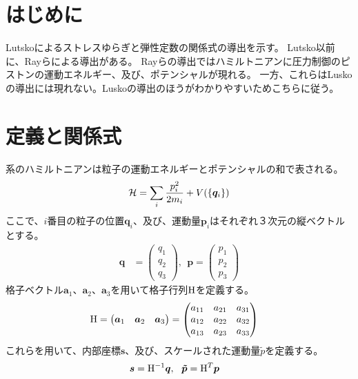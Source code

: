 \documentclass[11pt,a4paper,uplatex]{jsarticle}
\begin{document}
\section{はじめに}
Lutskoによるストレスゆらぎと弾性定数の関係式の導出を示す\cite{Lutsko1989}。
Lutsko以前に、Rayらによる導出がある。
Rayらの導出ではハミルトニアンに圧力制御のピストンの運動エネルギー、及び、ポテンシャルが現れる。
一方、これらはLuskoの導出には現れない。Luskoの導出のほうがわかりやすいためこちらに従う。
\section{定義と関係式}
系のハミルトニアンは粒子の運動エネルギーとポテンシャルの和で表される。
\begin{align}
    {\cal H} = \sum_{i} \frac{p_{i}^{2}}{2m_{i}} + V(\{\bm{q}_{i}\})
\end{align}    
ここで、$i$番目の粒子の位置$\bm{q}_{i}$、及び、運動量$\bm{p}_{i}$はそれぞれ３次元の縦ベクトルとする。
\begin{align}
\bm{q} &= \begin{pmatrix} q_{1} \\ q_{2} \\ q_{3} \end{pmatrix}, \ \ 
\bm{p} = \begin{pmatrix} p_{1} \\ p_{2} \\ p_{3} \end{pmatrix} 
\end{align}
格子ベクトル$\bm{a}_{1}$、$\bm{a}_{2}$、$\bm{a}_{3}$を用いて格子行列${\rm H}$を定義する。
\begin{align}
{\rm H} &= \begin{pmatrix} \bm{a}_{1} & \bm{a}_{2} & \bm{a}_{3} \end{pmatrix} 
    = \begin{pmatrix} 
        a_{11} & a_{21} & a_{31} \\
        a_{12} & a_{22} & a_{32} \\
        a_{13} & a_{23} & a_{33} \\
    \end{pmatrix} 
\end{align}
これらを用いて、内部座標$\bm{s}$、及び、スケールされた運動量$\tilde{p}$を定義する。
\begin{align}
    \bm{s} &= {\rm H}^{-1} \bm{q}, \ \
    \bm{\tilde{p}} = {\rm H}^{T} \bm{p}
\end{align}
\end{document}
